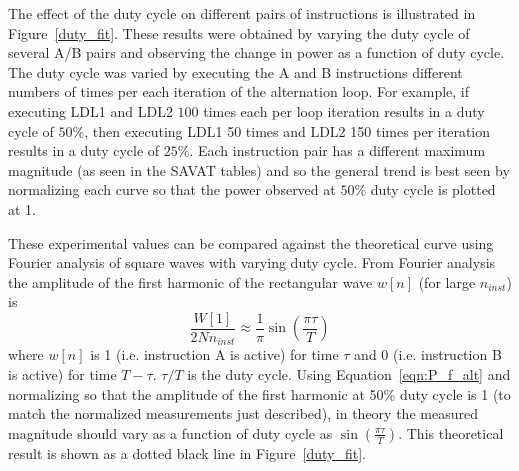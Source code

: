 The effect of the duty cycle on different pairs of instructions is illustrated in Figure~\ref{duty_fit}. These results were obtained by varying the duty cycle of several A/B pairs and observing the change in power as a function of duty cycle. The duty cycle was varied by executing the A and B instructions different numbers of times per each iteration of the alternation loop. For example, if executing LDL1 and LDL2 $100$ times each per loop iteration results in a duty cycle of $50\%$, then executing LDL1 50 times and LDL2 150 times per iteration results in a duty cycle of $25\%$. Each instruction pair has a different maximum magnitude (as seen in the SAVAT tables) and so the general trend is best seen by normalizing each curve so that the power observed at $50\%$ duty cycle is plotted at 1.

These experimental values can be compared against the theoretical curve using Fourier analysis of square waves with varying duty cycle. From Fourier analysis the amplitude of the first harmonic of the rectangular wave $w[n]$ (for large $n_{inst}$) is~\cite{smith1997}
\begin{equation} \label{duty_fourier}
\frac{W[1]}{2Nn_{inst}} \approx \frac{1}{\pi}\sin(\frac{\pi \tau}{T})
\end{equation}
where $w[n]$ is 1 (i.e. instruction A is active) for time $\tau$ and 0 (i.e. instruction B is active) for time $T-\tau$. $\tau/T$ is the duty cycle. Using Equation~\ref{eqn:P_f_alt} and normalizing so that the amplitude of the first harmonic at 50\% duty cycle is 1 (to match the normalized measurements just described), in theory the measured magnitude should vary as a function of duty cycle as $\sin(\frac{\pi \tau}{T})$. This theoretical result is shown as a dotted black line in Figure~\ref{duty_fit}.

